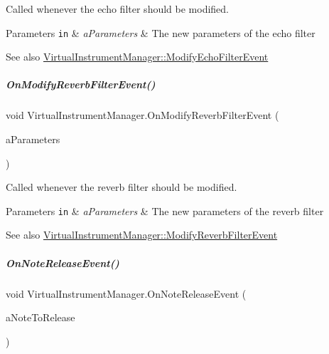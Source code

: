 Called whenever the echo filter should be modified. 


\begin{DoxyParams}[1]{Parameters}
\mbox{\tt in}  & {\em a\+Parameters} & The new parameters of the echo filter\\
\hline
\end{DoxyParams}
\begin{DoxySeeAlso}{See also}
\hyperlink{group___virtual_instrument_manager_class_virtual_instrument_manager_1_1_modify_echo_filter_event}{Virtual\+Instrument\+Manager\+::\+Modify\+Echo\+Filter\+Event} 
\end{DoxySeeAlso}
\mbox{\label{group___virtual_instrument_manager_a2b310217971075b1b2db67d68fbbea5a}} 
\subparagraph{\texorpdfstring{On\+Modify\+Reverb\+Filter\+Event()}{OnModifyReverbFilterEvent()}}
{\footnotesize\ttfamily void Virtual\+Instrument\+Manager.\+On\+Modify\+Reverb\+Filter\+Event (\begin{DoxyParamCaption}\item[{\hyperlink{group___virtual_instrument_manager_struct_virtual_instrument_manager_1_1_reverb_filter_parameters}{Reverb\+Filter\+Parameters}}]{a\+Parameters }\end{DoxyParamCaption})}



Called whenever the reverb filter should be modified. 


\begin{DoxyParams}[1]{Parameters}
\mbox{\tt in}  & {\em a\+Parameters} & The new parameters of the reverb filter\\
\hline
\end{DoxyParams}
\begin{DoxySeeAlso}{See also}
\hyperlink{group___virtual_instrument_manager_class_virtual_instrument_manager_1_1_modify_reverb_filter_event}{Virtual\+Instrument\+Manager\+::\+Modify\+Reverb\+Filter\+Event} 
\end{DoxySeeAlso}
\mbox{\label{group___virtual_instrument_manager_adae914ac99141bc37853d3c536c3943a}} 
\subparagraph{\texorpdfstring{On\+Note\+Release\+Event()}{OnNoteReleaseEvent()}}
{\footnotesize\ttfamily void Virtual\+Instrument\+Manager.\+On\+Note\+Release\+Event (\begin{DoxyParamCaption}\item[{Music.\+P\+I\+T\+CH}]{a\+Note\+To\+Release }\end{DoxyParamCaption})}



